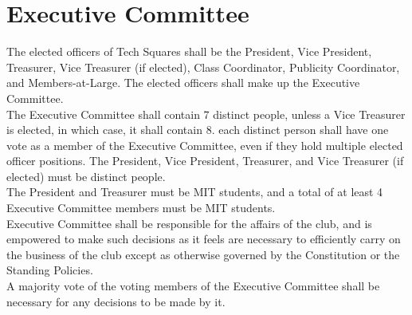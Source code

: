 \documentclass{article}
\begin{document}
\section{Executive Committee}
The elected officers of Tech Squares shall be the President, Vice President, Treasurer, Vice Treasurer (if elected), Class Coordinator, Publicity Coordinator, and Members-at-Large. The elected officers shall make up the Executive Committee.\\ The Executive Committee shall contain 7 distinct people, unless a Vice Treasurer is elected, in which case, it shall contain 8. each distinct person shall have one vote as a member of the Executive Committee, even if they hold multiple elected officer positions. The President, Vice President, Treasurer, and Vice Treasurer (if elected) must be distinct people. \\The President and Treasurer must be MIT students, and a total of at least 4 Executive Committee members must be MIT students. \\
Executive Committee  shall be responsible for the affairs of the club, and is empowered to make such decisions as it feels are necessary to efficiently carry on the business of the club except as otherwise governed by the Constitution or the Standing Policies.\\
A majority vote of the voting members of the Executive Committee shall be necessary for any decisions to be made by it.\\
\end{document}

